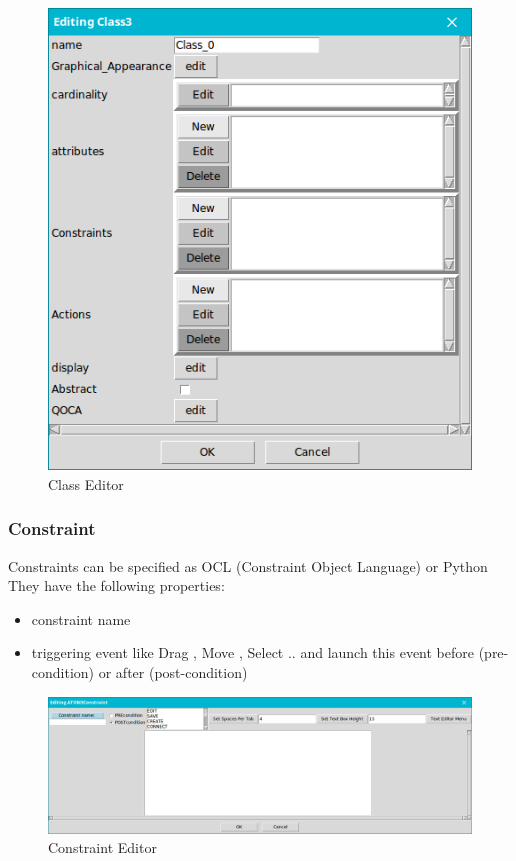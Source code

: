 \begin{figure}[th]
	\centering
		\includegraphics[scale=0.4]{Chapiter3/img/class}
	\caption{\label{fig:Class Editor}Class Editor}
\end{figure} 
\pagebreak
\subsubsection{ Constraint }

Constraints can be specified as OCL (Constraint Object Language) or Python
They have the following properties: 
\begin{itemize}
\item  constraint name
\item  triggering event  like Drag , Move , Select ..
and launch this event before (pre-condition) or after (post-condition)
 
\end{itemize}
 

\begin{figure}[th]
	\centering
	\includegraphics[scale=0.37]{Chapiter3/img/const}
	\caption{\label{fig:Constraint Editor}Constraint Editor}
\end{figure} 
\pagebreak

